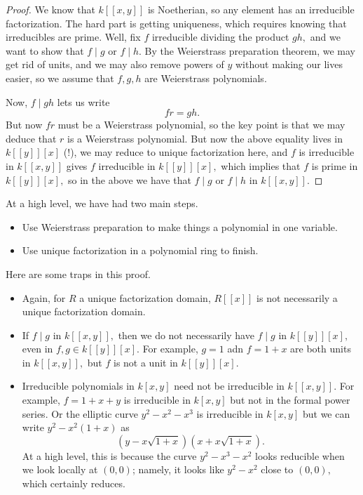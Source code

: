 \begin{proof}
	We know that $k[[x,y]]$ is Noetherian, so any element has an irreducible factorization. The hard part is getting uniqueness, which requires knowing that irreducibles are prime. Well, fix $f$ irreducible dividing the product $gh,$ and we want to show that $f\mid g$ or $f\mid h.$ By the Weierstrass preparation theorem, we may get rid of units, and we may also remove powers of $y$ without making our lives easier, so we assume that $f,g,h$ are Weierstrass polynomials.

	Now, $f\mid gh$ lets us write
	\[fr=gh.\]
	But now $fr$ must be a Weierstrass polynomial, so the key point is that we may deduce that $r$ is a Weierstrass polynomial. But now the above equality lives in $k[[y]][x]$ (!), we may reduce to unique factorization here, and $f$ is irreducible in $k[[x,y]]$ gives $f$ irreducible in $k[[y]][x],$ which implies that $f$ is prime in $k[[y]][x],$ so in the above we have that $f\mid g$ or $f\mid h$ in $k[[x,y]].$
\end{proof}
At a high level, we have had two main steps.
\begin{itemize}
	\item Use Weierstrass preparation to make things a polynomial in one variable.
	\item Use unique factorization in a polynomial ring to finish.
\end{itemize}
\begin{remark}
	Here are some traps in this proof.
	\begin{itemize}
		\item Again, for $R$ a unique factorization domain, $R[[x]]$ is not necessarily a unique factorization domain.
		\item If $f\mid g$ in $k[[x,y]],$ then we do not necessarily have $f\mid g$ in $k[[y]][x],$ even in $f,g\in k[[y]][x].$ For example, $g=1$ adn $f=1+x$ are both units in $k[[x,y]],$ but $f$ is not a unit in $k[[y]][x].$
		\item Irreducible polynomials in $k[x,y]$ need not be irreducible in $k[[x,y]].$ For example, $f=1+x+y$ is irreducible in $k[x,y]$ but not in the formal power series. Or the elliptic curve $y^2-x^2-x^3$ is irreducible in $k[x,y]$ but we can write $y^2-x^2(1+x)$ as
		\[\left(y-x\sqrt{1+x}\right)\left(x+x\sqrt{1+x}\right).\]
		At a high level, this is because the curve $y^2-x^3-x^2$ looks reducible when we look locally at $(0,0)$; namely, it looks like $y^2-x^2$ close to $(0,0),$ which certainly reduces.
	\end{itemize}
\end{remark}

